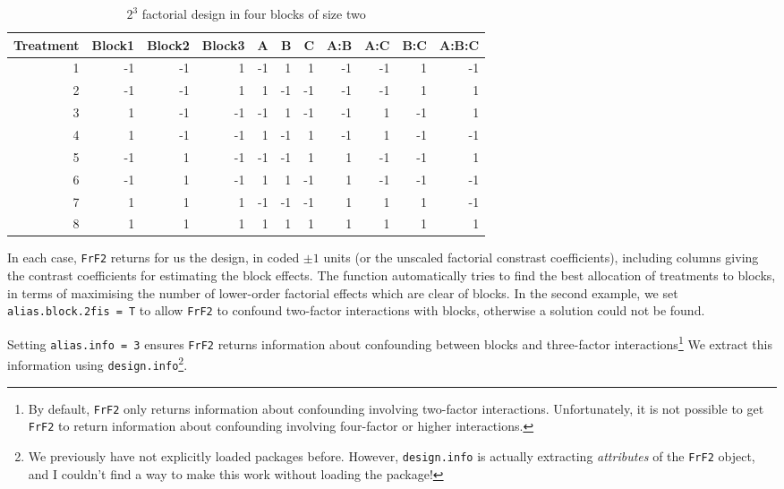 \documentclass[
]{book}
\theoremstyle{definition}
\theoremstyle{definition}
\theoremstyle{definition}
\theoremstyle{definition}
\theoremstyle{remark}
\begin{document}
\begin{table}

\caption{\label{tab:frf2-block-2}$2^3$ factorial design in four blocks of size two}
\centering
\begin{tabular}[t]{r|r|r|r|r|r|r|r|r|r|r}
\hline
Treatment & Block1 & Block2 & Block3 & A & B & C & A:B & A:C & B:C & A:B:C\\
\hline
1 & -1 & -1 & 1 & -1 & 1 & 1 & -1 & -1 & 1 & -1\\
\hline
2 & -1 & -1 & 1 & 1 & -1 & -1 & -1 & -1 & 1 & 1\\
\hline
3 & 1 & -1 & -1 & -1 & 1 & -1 & -1 & 1 & -1 & 1\\
\hline
4 & 1 & -1 & -1 & 1 & -1 & 1 & -1 & 1 & -1 & -1\\
\hline
5 & -1 & 1 & -1 & -1 & -1 & 1 & 1 & -1 & -1 & 1\\
\hline
6 & -1 & 1 & -1 & 1 & 1 & -1 & 1 & -1 & -1 & -1\\
\hline
7 & 1 & 1 & 1 & -1 & -1 & -1 & 1 & 1 & 1 & -1\\
\hline
8 & 1 & 1 & 1 & 1 & 1 & 1 & 1 & 1 & 1 & 1\\
\hline
\end{tabular}
\end{table}

In each case, \texttt{FrF2} returns for us the design, in coded \(\pm 1\) units (or the unscaled factorial constrast coefficients), including columns giving the contrast coefficients for estimating the block effects. The function automatically tries to find the best allocation of treatments to blocks, in terms of maximising the number of lower-order factorial effects which are clear of blocks. In the second example, we set \texttt{alias.block.2fis\ =\ T} to allow \texttt{FrF2} to confound two-factor interactions with blocks, otherwise a solution could not be found.

Setting \texttt{alias.info\ =\ 3} ensures \texttt{FrF2} returns information about confounding between blocks and three-factor interactions\footnote{By default, \texttt{FrF2} only returns information about confounding involving two-factor interactions. Unfortunately, it is not possible to get \texttt{FrF2} to return information about confounding involving four-factor or higher interactions.} We extract this information using \texttt{design.info}\footnote{We previously have not explicitly loaded packages before. However, \texttt{design.info} is actually extracting \emph{attributes} of the \texttt{FrF2} object, and I couldn't find a way to make this work without loading the package!}.
\end{document}
